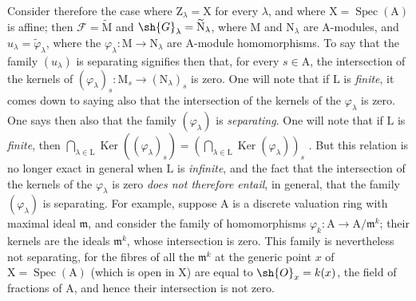 \begin{env}[11.9.4]
\label{IV.11.9.4}
Consider therefore the case where $\mathrm{Z}_\lambda=\mathrm{X}$ for every $\lambda$, and where $\mathrm{X}=\operatorname{Spec}(\mathrm{A})$ is affine; then $\mathscr{F}=\widetilde{\mathrm{M}}$ and $\sh{G}_\lambda=\widetilde{\mathrm{N}}_\lambda$, where $\mathrm{M}$ and $\mathrm{N}_\lambda$ are $\mathrm{A}$-modules, and $u_\lambda=\widetilde{\varphi}_\lambda$, where the $\varphi_\lambda:\mathrm{M}\to\mathrm{N}_\lambda$ are $\mathrm{A}$-module homomorphisms.
To say that the family $(u_\lambda)$ is separating signifies then that, for every $s\in\mathrm{A}$, the intersection of the kernels of $(\varphi_\lambda)_s:\mathrm{M}_s\to(\mathrm{N}_\lambda)_s$ is zero.
One will note that if $\mathrm{L}$ is \emph{finite}, it comes down to saying also that the intersection of the kernels of the $\varphi_\lambda$ is zero.
One says then also that the family $(\varphi_\lambda)$ is \emph{separating}.
One will note that if $\mathrm{L}$ is \emph{finite}, then $\bigcap_{\lambda\in\mathrm{L}}\operatorname{Ker}((\varphi_\lambda)_s)=(\bigcap_{\lambda\in\mathrm{L}}\operatorname{Ker}(\varphi_\lambda))_s$ .
But this relation is no longer exact in general
when $\mathrm{L}$ is \emph{infinite}, and the fact that the intersection of the kernels of the $\varphi_\lambda$ is zero \emph{does not therefore entail},
in general, that the family $(\varphi_\lambda)$ is separating.
For example, suppose $\mathrm{A}$ is a discrete valuation ring with maximal ideal $\mathfrak{m}$, and consider the family of homomorphisms $\varphi_k:\mathrm{A}\to\mathrm{A}/\mathfrak{m}^k$; their kernels are the ideals $\mathfrak{m}^k$, whose intersection is zero. This family is nevertheless not separating, for the fibres of all the $\mathfrak{m}^k$ at the generic point $x$ of $\mathrm{X}=\operatorname{Spec}(\mathrm{A})$ (which is open in $\mathrm{X}$) are equal to $\sh{O}_x=k(x)$, the field of fractions of $\mathrm{A}$, and hence their intersection is not zero.
\end{env}

